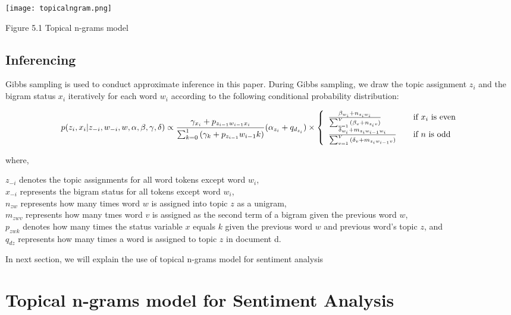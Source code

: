 \texttt{[image: topicalngram.png]} 
\begin{center}
 Figure 5.1 Topical n-grams model
\end{center}

\subsection{Inferencing}

Gibbs sampling is used to conduct approximate inference in this paper. During Gibbs sampling, we draw the topic assignment \(z_i\) and the bigram status \(x_i\) 
iteratively for each word \(w_i\) according to the following conditional probability distribution:

\begin{equation}
p(z_i,x_i | z_{-i},w_{-i},w,\alpha,\beta,\gamma,\delta) \propto
\frac{\gamma_{x_i} + p_{z_{i-1}w_{i-1}x_i}}{\sum_{k=0}^1 {(\gamma_k+p_{z_{i-1}}w_{i-1}k)}} {(\alpha_{z_i} + q_{d_{z_i}})} \times \left\{ 
  \begin{array}{l l}
    \frac{\beta_{w_i} + n_{z_i w_i}}{\sum_{v=1}^V {(\beta_v+n_{z_i v})}} & \quad \text{if $x_i$ is even}\\
    \frac{\delta_{w_i} + m_{z_i w_{i-1} w_i}}{\sum_{v=1}^V {(\delta_v + m_{z_i w_{i-1} v})} } & \quad \text{if $n$ is odd}
  \end{array} \right.
\end{equation}

where, 

\(z_{-i}\) denotes the topic assignments for all word tokens except word \(w_i\), \\ 
\(x_{-i}\) represents the bigram status for all tokens except word \(w_i\), \\ 
\(n_{zw}\) represents how many times word \(w\) is assigned into topic \(z\) as a unigram, \\
\(m_{zwv}\) represents how many tmes word \(v\) is assigned as the second term of a bigram given the previous word \(w\), \\
\(p_{zwk}\) denotes how many times the status variable \(x\) equals \(k\) given the previous word \(w\) and previous word's topic \(z\), and \\
\(q_{dz}\) represents how many times a word is assigned to topic \(z\) in document d.

In next section, we will explain the use of topical n-grams model for sentiment analysis

\section{Topical n-grams model for Sentiment Analysis}

